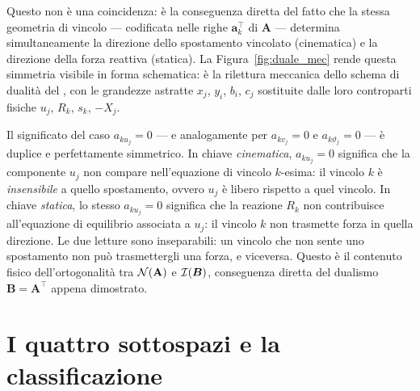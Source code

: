 Questo non è una coincidenza: è la conseguenza diretta del
fatto che la stessa geometria di vincolo --- codificata nelle
righe $\bm{a}_k^\top$ di $\bm{A}$ --- determina simultaneamente
la direzione dello spostamento vincolato (cinematica) e la
direzione della forza reattiva (statica). La
Figura~\ref{fig:duale_mec} rende questa simmetria visibile
in forma schematica: è la rilettura meccanica dello schema
di dualità del , con le grandezze astratte
$x_j$, $y_i$, $b_i$, $c_j$ sostituite dalle loro
controparti fisiche $u_j$, $R_k$, $s_k$, $-X_j$.

\begin{oss}
	Il significato del caso $a_{ku_j} = 0$ --- e
	analogamente per $a_{kv_j} = 0$ e
	$a_{k\vartheta_j} = 0$ --- è duplice e perfettamente
	simmetrico. In chiave \emph{cinematica}, $a_{ku_j} = 0$
	significa che la componente $u_j$ non compare
	nell'equazione di vincolo $k$-esima: il vincolo $k$ è
	\emph{insensibile} a quello spostamento, ovvero $u_j$
	è libero rispetto a quel vincolo. In chiave
	\emph{statica}, lo stesso $a_{ku_j} = 0$ significa che
	la reazione $R_k$ non contribuisce all'equazione di
	equilibrio associata a $u_j$: il vincolo $k$ non
	trasmette forza in quella direzione. Le due letture
	sono inseparabili: un vincolo che non sente uno
	spostamento non può trasmettergli una forza, e
	viceversa. Questo è il contenuto fisico
	dell'ortogonalità tra $\mathcal{N}(\mathbf{A})$ e $\mathcal{I}(\bm{B})$,
	conseguenza diretta del dualismo $\bm{B} = \bm{A}^{\top}$
	appena dimostrato.
\end{oss}

\section{I quattro sottospazi e la classificazione}\label{sec:quattro}

